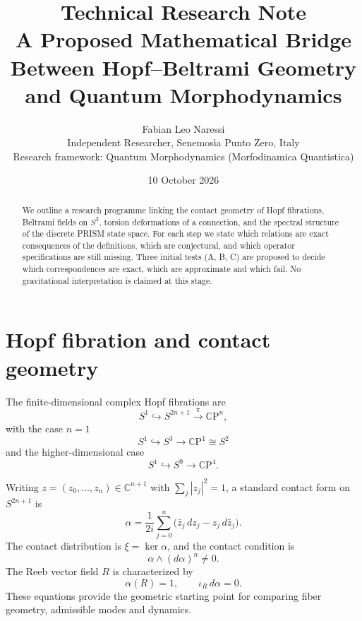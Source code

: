 \documentclass[11pt,a4paper]{article}
\title{Technical Research Note\\[4pt]
\large A Proposed Mathematical Bridge Between Hopf--Beltrami Geometry\\
and Quantum Morphodynamics}
\author{Fabian Leo Naressi\\
\small Independent Researcher, Senemosìa Punto Zero, Italy\\
\small Research framework: Quantum Morphodynamics (Morfodinamica Quantistica)}
\date{10 October 2026}
\newcommand{\CC}{\mathbb{C}}
\begin{document}
\maketitle

\begin{abstract}
We outline a research programme linking the contact geometry of Hopf fibrations,
Beltrami fields on $S^3$, torsion deformations of a connection, and the spectral
structure of the discrete PRISM state space. For each step we state which
relations are exact consequences of the definitions, which are conjectural, and
which operator specifications are still missing. Three initial tests (A, B, C)
are proposed to decide which correspondences are exact, which are approximate
and which fail. No gravitational interpretation is claimed at this stage.
\end{abstract}

\section{Hopf fibration and contact geometry}

The finite-dimensional complex Hopf fibrations are
\begin{equation}
S^1\hookrightarrow S^{2n+1}\xrightarrow{\ \pi\ }\CC\mathrm{P}^{n},
\end{equation}
with the case $n=1$
\begin{equation}
S^1\hookrightarrow S^3\longrightarrow \CC\mathrm{P}^{1}\cong S^2
\end{equation}
and the higher-dimensional case
\begin{equation}
S^1\hookrightarrow S^9\longrightarrow \CC\mathrm{P}^{4}.
\end{equation}

Writing $z=(z_0,\ldots,z_n)\in\CC^{n+1}$ with $\sum_j|z_j|^2=1$, a standard
contact form on $S^{2n+1}$ is
\begin{equation}
\alpha=\frac{1}{2i}\sum_{j=0}^{n}\bigl(\bar z_j\,dz_j-z_j\,d\bar z_j\bigr).
\end{equation}
The contact distribution is $\xi=\ker\alpha$, and the contact condition is
\begin{equation}
\alpha\wedge(d\alpha)^n\neq0 .
\end{equation}
The Reeb vector field $R$ is characterized by
\begin{equation}
\alpha(R)=1,\qquad \iota_R\,d\alpha=0 .
\end{equation}
These equations provide the geometric starting point for comparing fiber
geometry, admissible modes and dynamics.
\end{document}
